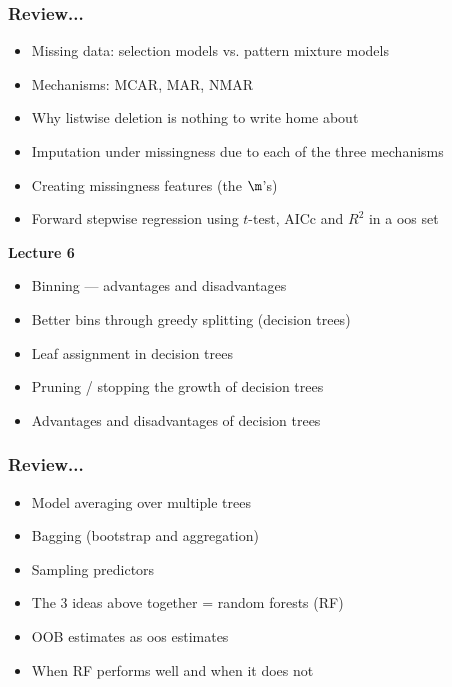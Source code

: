 \documentclass[handout]{beamer}
\begin{document}
\begin{frame}\frametitle{Review...}

\begin{itemize}
\item Missing data: selection models vs. pattern mixture models
\item Mechanisms: MCAR, MAR, NMAR
\item Why listwise deletion is nothing to write home about
\item Imputation under missingness due to each of the three mechanisms
\item Creating missingness features (the $\m$'s)
\item Forward stepwise regression using $t$-test, AICc and $R^2$ in a oos set
\end{itemize}
	
\textbf{Lecture 6}

\begin{itemize}
\item Binning --- advantages and disadvantages
\item Better bins through greedy splitting (decision trees)
\item Leaf assignment in decision trees
\item Pruning / stopping the growth of decision trees
\item Advantages and disadvantages of decision trees
\end{itemize}
	
\end{frame}

\begin{frame}\frametitle{Review...}

\begin{itemize}
\item Model averaging over multiple trees
\item Bagging (bootstrap and aggregation)
\item Sampling predictors
\item The 3 ideas above together = random forests (RF)
\item OOB estimates as oos estimates
\item When RF performs well and when it does not
\end{itemize}
	
\end{frame}
\end{document}
